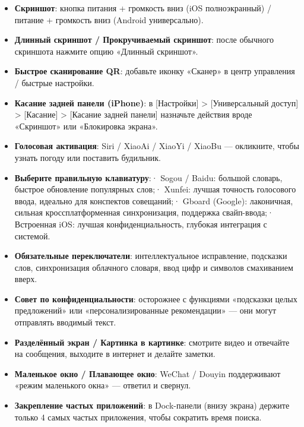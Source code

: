 \begin{itemize}
  \item \textbf{Скриншот}: кнопка питания + громкость вниз (iOS полноэкранный) / питание + громкость вниз (Android универсально).
  \item \textbf{Длинный скриншот / Прокручиваемый скриншот}: после обычного скриншота нажмите опцию «Длинный скриншот».
  \item \textbf{Быстрое сканирование QR}: добавьте иконку «Сканер» в центр управления / быстрые настройки.
  \item \textbf{Касание задней панели (iPhone)}: в [Настройки] > [Универсальный доступ] > [Касание] > [Касание задней панели] назначьте действия вроде «Скриншот» или «Блокировка экрана».
  \item \textbf{Голосовая активация}: Siri / XiaoAi / XiaoYi / XiaoBu — окликните, чтобы узнать погоду или поставить будильник.
\end{itemize}


\begin{itemize}
  \item \textbf{Выберите правильную клавиатуру}:\newline · Sogou / Baidu: большой словарь, быстрое обновление популярных слов;\newline · Xunfei: лучшая точность голосового ввода, идеально для конспектов совещаний;\newline · Gboard (Google): лаконичная, сильная кроссплатформенная синхронизация, поддержка свайп-ввода;\newline · Встроенная iOS: лучшая конфиденциальность, глубокая интеграция с системой.
  \item \textbf{Обязательные переключатели}: интеллектуальное исправление, подсказки слов, синхронизация облачного словаря, ввод цифр и символов смахиванием вверх.
  \item \textbf{Совет по конфиденциальности}: осторожнее с функциями «подсказки целых предложений» или «персонализированные рекомендации» — они могут отправлять вводимый текст.
\end{itemize}


\begin{itemize}
  \item \textbf{Разделённый экран / Картинка в картинке}: смотрите видео и отвечайте на сообщения, выходите в интернет и делайте заметки.
  \item \textbf{Маленькое окно / Плавающее окно}: WeChat / Douyin поддерживают «режим маленького окна» — ответил и свернул.
  \item \textbf{Закрепление частых приложений}: в Dock-панели (внизу экрана) держите только 4 самых частых приложения, чтобы сократить время поиска.
\end{itemize}

